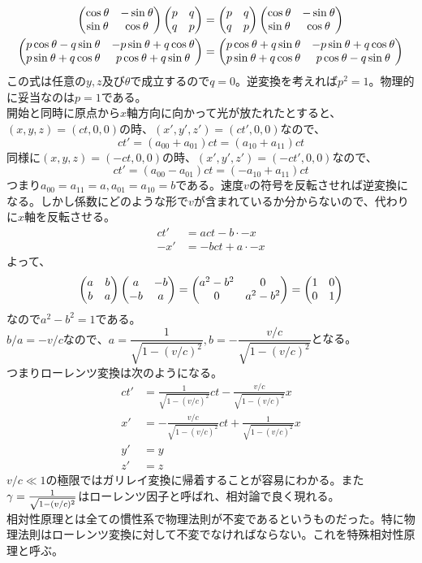         \begin{align*}
            \begin{pmatrix} \cos^{}\theta & -\sin^{}\theta\\ \sin^{}\theta & \cos^{}\theta \end{pmatrix}\begin{pmatrix} p&q\\q&p \end{pmatrix}
            &= \begin{pmatrix} p&q\\q&p \end{pmatrix}\begin{pmatrix} \cos^{}\theta & -\sin^{}\theta\\ \sin^{}\theta & \cos^{}\theta \end{pmatrix}\\
            \begin{pmatrix} p\cos^{}\theta-q\sin^{}\theta&-p\sin^{}\theta+q\cos^{}\theta\\p\sin^{}\theta+q\cos^{}\theta&p\cos^{}\theta+q\sin^{}\theta \end{pmatrix}
            &= \begin{pmatrix} p\cos^{}\theta+q\sin^{}\theta&-p\sin^{}\theta+q\cos^{}\theta\\p\sin^{}\theta+q\cos^{}\theta&p\cos^{}\theta-q\sin^{}\theta \end{pmatrix}
        \end{align*}
        この式は任意の$y,z及び\theta$で成立するので$q=0$。逆変換を考えれば$p^2=1$。物理的に妥当なのは$p=1$である。\\開始と同時に原点から$x$軸方向に向かって光が放たれたとすると、
        $(x,y,z)=(ct,0,0)の時、(x',y',z')=(ct',0,0)$なので、
            \[ct' = (a_{00}+a_{01})ct = (a_{10}+a_{11})ct\]
        同様に$(x,y,z)=(-ct,0,0)の時、(x',y',z')=(-ct',0,0)$なので、
            \[ct' = (a_{00}-a_{01})ct = (-a_{10}+a_{11})ct\]
        つまり$a_{00}=a_{11}=a,a_{01}=a_{10}=b$である。速度$v$の符号を反転させれば逆変換になる。しかし係数にどのような形で$v$が含まれているか分からないので、代わりに$x$軸を反転させる。
        \begin{align*}
            ct' &= act-b\cdot -x\\
            -x' &= -bct + a\cdot -x
        \end{align*}
        よって、
        \[
            \begin{pmatrix} a&b\\b&a \end{pmatrix}\begin{pmatrix} a&-b\\-b&a \end{pmatrix}
            =\begin{pmatrix} a^2-b^2&0\\0&a^2-b^2 \end{pmatrix}=\begin{pmatrix} 1&0\\0&1 \end{pmatrix}
        \]
        なので$a^2-b^2=1$である。$b/a=-v/cなので、a=\dfrac{1}{\sqrt{1-(v/c)^2}}
        ,b=-\dfrac{v/c}{\sqrt{1-(v/c)^2}}$となる。\\
        つまりローレンツ変換は次のようになる。
        \begin{align*}
            ct' &= \frac{1}{\sqrt{1-(v/c)^2}}ct-\frac{v/c}{\sqrt{1-(v/c)^2}}x\\
            x' &= -\frac{v/c}{\sqrt{1-(v/c)^2}}ct+\frac{1}{\sqrt{1-(v/c)^2}}x\\
            y' &= y\\
            z' &= z
        \end{align*}
        $v/c\ll 1$の極限ではガリレイ変換に帰着することが容易にわかる。また$\gamma=\frac{1}{\sqrt{1-(v/c)^2}}$はローレンツ因子と呼ばれ、相対論で良く現れる。\\
        相対性原理とは全ての慣性系で物理法則が不変であるというものだった。特に物理法則はローレンツ変換に対して不変でなければならない。これを特殊相対性原理と呼ぶ。
